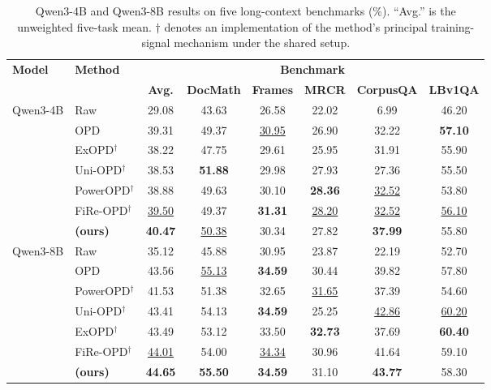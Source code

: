 \ifdefined\GCOPDSingleColumnLayout
\begin{table}[t]
\else
\begin{table}[t]
\fi
\caption{Qwen3-4B and Qwen3-8B results on five long-context benchmarks (\%). ``Avg.'' is the unweighted five-task mean. $\dagger$ denotes an implementation of the method's principal training-signal mechanism under the shared setup.}
\label{tab:main-results}
\centering
\small
\setlength{\tabcolsep}{4.0pt}
\begin{tabular}{l l c c c c c c }
\toprule
\multirow{2}{*}{\bf Model} & \multirow{2}{*}{\bf Method} & \multicolumn{6}{c}{\bf Benchmark} \\
\cmidrule(lr){3-8}
& & \bf Avg. & \bf DocMath & \bf Frames & \bf MRCR & \bf CorpusQA & \bf LBv1QA \\
\cmidrule(lr){1-2} \cmidrule(lr){3-8}
\multirow{7}{*}{Qwen3-4B}
& Raw & 29.08 & 43.63 & 26.58 & 22.02 & 6.99 & 46.20 \\
& OPD & 39.31 & 49.37 & \underline{30.95} & 26.90 & 32.22 & \textbf{57.10} \\
& ExOPD$^{\dagger}$ & 38.22 & 47.75 & 29.61 & 25.95 & 31.91 & 55.90 \\
& Uni-OPD$^{\dagger}$ & 38.53 & \textbf{51.88} & 29.98 & 27.93 & 27.36 & 55.50 \\
& PowerOPD$^{\dagger}$ & 38.88 & 49.63 & 30.10 & \textbf{28.36} & \underline{32.52} & 53.80 \\
& FiRe-OPD$^{\dagger}$ & \underline{39.50} & 49.37 & \textbf{31.31} & \underline{28.20} & \underline{32.52} & \underline{56.10} \\
\cmidrule(lr){2-2} \cmidrule(lr){3-8}
& \textbf{\method{} (ours)} & \textbf{40.47} & \underline{50.38} & 30.34 & 27.82 & \textbf{37.99} & 55.80 \\
\cmidrule(lr){1-2} \cmidrule(lr){3-8}
\multirow{7}{*}{Qwen3-8B}
& Raw & 35.12 & 45.88 & 30.95 & 23.87 & 22.19 & 52.70 \\
& OPD & 43.56 & \underline{55.13} & \textbf{34.59} & 30.44 & 39.82 & 57.80 \\
& PowerOPD$^{\dagger}$ & 41.53 & 51.38 & 32.65 & \underline{31.65} & 37.39 & 54.60 \\
& Uni-OPD$^{\dagger}$ & 43.41 & 54.13 & \textbf{34.59} & 25.25 & \underline{42.86} & \underline{60.20} \\
& ExOPD$^{\dagger}$ & 43.49 & 53.12 & 33.50 & \textbf{32.73} & 37.69 & \textbf{60.40} \\
& FiRe-OPD$^{\dagger}$ & \underline{44.01} & 54.00 & \underline{34.34} & 30.96 & 41.64 & 59.10 \\
\cmidrule(lr){2-2} \cmidrule(lr){3-8}
& \textbf{\method{} (ours)} & \textbf{44.65} & \textbf{55.50} & \textbf{34.59} & 31.10 & \textbf{43.77} & 58.30 \\
\bottomrule
\end{tabular}
\ifdefined\GCOPDSingleColumnLayout
\end{table}
\else
\end{table}
\fi
